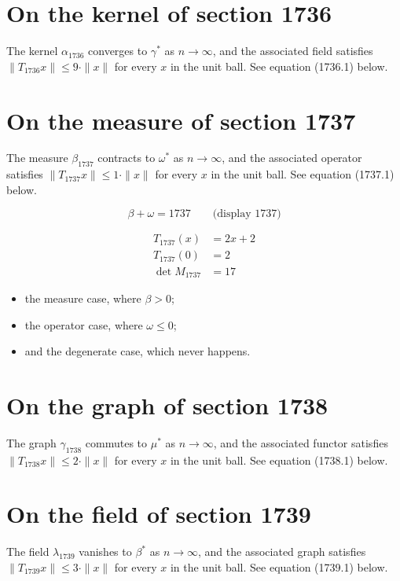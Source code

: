 \documentclass{article}
\begin{document}
\section{On the kernel of section 1736}
The kernel $\alpha_{1736}$ converges to $\gamma^{*}$ as $n \to \infty$,
and the associated field satisfies $\|T_{1736} x\| \leq 9 \cdot \|x\|$
for every $x$ in the unit ball. See equation (1736.1) below.

\section{On the measure of section 1737}
The measure $\beta_{1737}$ contracts to $\omega^{*}$ as $n \to \infty$,
and the associated operator satisfies $\|T_{1737} x\| \leq 1 \cdot \|x\|$
for every $x$ in the unit ball. See equation (1737.1) below.

$$
\beta + \omega = 1737 \qquad \text{(display 1737)}
$$

\begin{align}
T_{1737}(x) &= 2 x + 2 \\
T_{1737}(0) &= 2 \\
\det M_{1737} &= 17
\end{align}

\begin{itemize}
  \item the measure case, where $\beta > 0$;
  \item the operator case, where $\omega \leq 0$;
  \item and the degenerate case, which never happens.
\end{itemize}

\section{On the graph of section 1738}
The graph $\gamma_{1738}$ commutes to $\mu^{*}$ as $n \to \infty$,
and the associated functor satisfies $\|T_{1738} x\| \leq 2 \cdot \|x\|$
for every $x$ in the unit ball. See equation (1738.1) below.

\section{On the field of section 1739}
The field $\lambda_{1739}$ vanishes to $\beta^{*}$ as $n \to \infty$,
and the associated graph satisfies $\|T_{1739} x\| \leq 3 \cdot \|x\|$
for every $x$ in the unit ball. See equation (1739.1) below.
\end{document}
